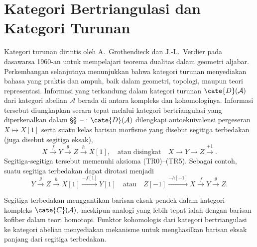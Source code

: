 
\chapter{Kategori Bertriangulasi dan Kategori Turunan\texorpdfstring{\hspace{0.1em}}{}}%
\label{sec:triangulated-derived-cat}
\hypertarget{o014.aljabr2.chapter4.overview}{ }

Kategori turunan dirintis oleh A.\ Grothendieck dan J.-L.\ Verdier pada
dasawarsa 1960-an untuk mempelajari teorema dualitas dalam geometri aljabar.
Perkembangan selanjutnya menunjukkan bahwa kategori turunan menyediakan
bahasa yang praktis dan ampuh, baik dalam geometri, topologi, maupun teori
representasi. Informasi yang terkandung dalam kategori turunan
$\cate{D}(\mathcal{A})$ dari kategori abelian $\mathcal{A}$ berada di antara
kompleks dan kohomologinya. Informasi tersebut diungkapkan secara tepat melalui
kategori bertriangulasi yang diperkenalkan dalam
\S\S~--%
: $\cate{D}(\mathcal{A})$ dilengkapi
autoekuivalensi pergeseran $X\mapsto X[1]$ serta suatu kelas barisan morfisme
yang disebut segitiga terbedakan (juga disebut segitiga eksak),
\[
  X \xrightarrow{f} Y \xrightarrow{g} Z \xrightarrow{h} X[1],
  \quad \text{atau disingkat}\quad X\to Y\to Z\xrightarrow{+1} .
\]
Segitiga-segitiga tersebut memenuhi aksioma (TR0)--(TR5). Sebagai contoh,
suatu segitiga terbedakan dapat dirotasi menjadi
\[
  Y \xrightarrow{g} Z \xrightarrow{h} X[1] \xrightarrow{-f[1]} Y[1]
  \quad\text{atau}\quad
  Z[-1] \xrightarrow{-h[-1]} X \xrightarrow{f} Y \xrightarrow{g} Z .
\]

Segitiga terbedakan menggantikan barisan eksak pendek dalam kategori kompleks
$\cate{C}(\mathcal{A})$, meskipun analogi yang lebih tepat ialah dengan
barisan kofiber dalam teori homotopi. Funktor kohomologis dari kategori
bertriangulasi ke kategori abelian menyediakan mekanisme untuk menghasilkan
barisan eksak panjang dari segitiga terbedakan.

